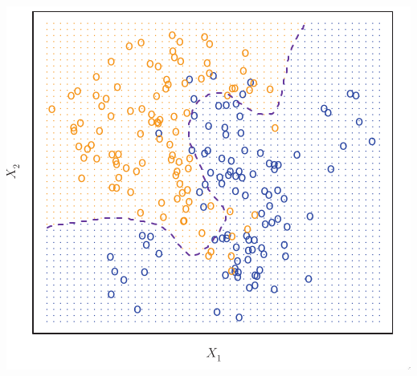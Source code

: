 \documentclass[leqno, 10pt, envcountsect]{beamer}
\numberwithin{equation}{section}
\theoremstyle{definition}
\theoremstyle{example}
\numberwithin{figure}{section}
\numberwithin{table}{section}
\begin{document}
\begin{frame}
\begin{center}
  \includegraphics[scale=0.15]{frontier}
\end{center}
\end{frame}
\end{document}
